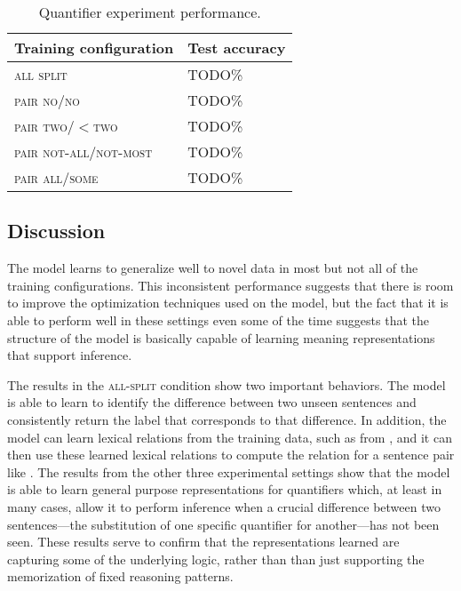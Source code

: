 \begin{table}\small\centering
\begin{tabular}{|l|l|}\hline
\textbf{Training configuration} & \textbf{Test accuracy}\\\hline
\textsc{all split}	&	TODO\% \\\hline
\textsc{pair no/no}	&	TODO\% \\
\textsc{pair two/$<$two}	&	TODO\% \\
\textsc{pair not-all/not-most}	&	TODO\% \\
\textsc{pair all/some}	&	TODO\% \\\hline
\end{tabular}

\caption{Quantifier experiment performance.\label{resultstable}}
\end{table} %



\subsection{Discussion} 


The model learns to generalize well to novel data in most but not all of the training configurations. This inconsistent performance suggests that there is room to improve the optimization techniques used on the model, but the fact that it is able to perform well in these settings even some of the time suggests that the structure of the model is basically capable of learning meaning representations that support inference.

The results in the \textsc{all-split} condition show two important behaviors. The model is able to learn to identify the difference between two unseen sentences and consistently return the label that corresponds to that difference. In addition, the model can learn lexical relations from the training data, such as  from , and it can then use these learned lexical relations to compute the relation for a sentence pair like . The results from the other three experimental settings show that the model is able to learn general purpose representations for quantifiers which, at least in many cases, allow it to perform inference when a crucial difference between two sentences---the  substitution of one specific quantifier for another---has not been seen. These results serve to confirm that the representations learned are capturing some of the underlying logic, rather than than just supporting the memorization of fixed reasoning patterns. 

